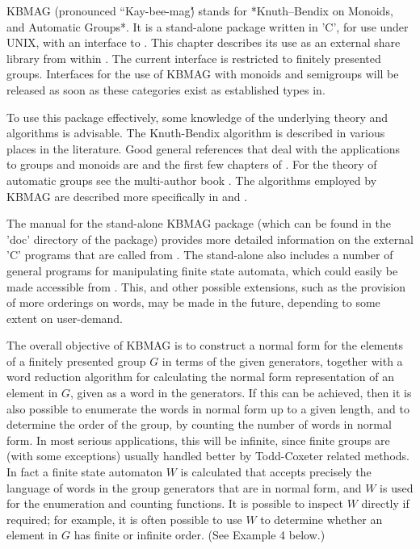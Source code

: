 \newcommand{\KBMAG}{{\sf KBMAG}}
%
{\KBMAG}  (pronounced ``Kay-bee-mag\'\') stands  for *Knuth--Bendix on
Monoids, and Automatic Groups*.  It  is a stand-alone package  written
in 'C', for use under UNIX, with an interface to {\GAP}.  This chapter
describes  its use as  an external  share  library from within {\GAP}.
The   current interface is   restricted  to finitely presented groups.
Interfaces for the use of {\KBMAG} with monoids and semigroups will be
released  as soon  as   these categories exist  as  established  types
in{\GAP}.

To use  this  package effectively,  some  knowledge  of the underlying
theory  and algorithms  is  advisable.  The  Knuth-Bendix algorithm is
described in various places in the literature. Good general references
that deal with the applications to groups and monoids are \cite{LeC86}
and  the  first few  chapters of   \cite{Sims94}.   For the  theory of
automatic   groups  see  the   multi-author book  \cite{ECHLPT92}. The
algorithms employed by {\KBMAG}   are described more  specifically  in
\cite{EHR91} and \cite{Holt94}.

The manual for the stand-alone {\KBMAG} package (which can be found in
the 'doc' directory of the package) provides more detailed information
on    the external 'C'   programs that  are called   from {\GAP}.  The
stand-alone also     includes  a number     of  general programs   for
manipulating finite  state automata,    which could easily    be  made
accessible from {\GAP}.  This,  and other possible extensions, such as
the provision of more orderings  on words, may be  made in the future,
depending to some extent on user-demand.

The overall  objective of {\KBMAG} is  to construct a  normal form for
the elements of a  finitely presented group  $G$ in terms of the given
generators, together with  a word reduction algorithm for  calculating
the normal form representation  of an element in  $G$, given as a word
in the generators.  If this can be achieved,  then it is also possible
to enumerate the words  in normal form up to   a given length,  and to
determine the order  of the group, by counting  the number of words in
normal  form. In most  serious  applications,  this will be  infinite,
since finite groups are (with some  exceptions) usually handled better
by Todd-Coxeter related methods. In fact a  finite state automaton $W$
is  calculated  that accepts precisely the   language of words  in the
group  generators that are   in normal form,  and $W$  is used for the
enumeration  and counting  functions.  It is possible  to  inspect $W$
directly if required; for example, it is often  possible to use $W$ to
determine whether an element in $G$ has finite or infinite order. (See
Example 4 below.)

